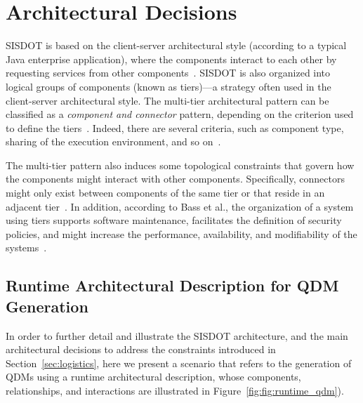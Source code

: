\section{Architectural Decisions}
\label{sec:architecture} 

SISDOT is based on the client-server architectural style (according to 
a typical Java enterprise application), where the components interact to each other by requesting 
services from other components~\cite{clements2011documenting}. 
SISDOT is also organized into logical groups of 
components (known as tiers)---a strategy often used in the 
client-server architectural style. The multi-tier architectural pattern 
can be classified as a \emph{component and connector} pattern, 
depending on the criterion used to define the tiers~\cite{bass2013software}. 
Indeed, there are several criteria, such as component type, sharing of the execution environment, 
and so on~\cite{clements2011documenting}.

The multi-tier pattern also induces some topological constraints 
that govern how the components might interact with other components. 
Specifically, connectors might only exist 
between components of the same tier or that reside in an adjacent 
tier~\cite{clements2011documenting}. In addition, according to Bass et al., 
the organization of a system using tiers supports software maintenance, facilitates the definition of 
security policies, and might increase the performance, availability, and modifiability of 
the systems~\cite{bass2013software}. 


\subsection{Runtime Architectural Description for QDM Generation}

In order to further detail and illustrate the SISDOT architecture, 
and the main architectural decisions to address the constraints introduced 
in Section~\ref{sec:logistics}, here we present a scenario that refers to the 
generation of QDMs using a runtime architectural 
description, whose components, relationships, and interactions are illustrated
in Figure~\ref{fig:fig:runtime_qdm}). 

